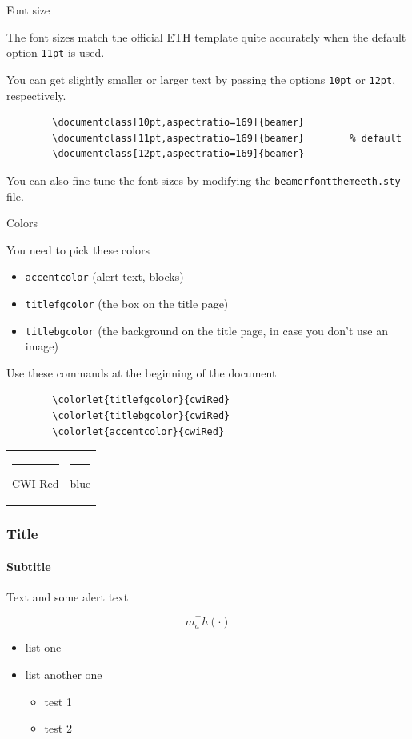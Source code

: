 \documentclass[12pt,aspectratio=169]{beamer}
\begin{document}
\begin{frame}[fragile]{Font size}

	The font sizes match the official ETH template quite accurately when the default option \verb+11pt+ is used.
	
	\bigskip
	
	You can get slightly smaller or larger text by passing the options \verb+10pt+ or \verb+12pt+, respectively.
	\begin{verbatim}
		\documentclass[10pt,aspectratio=169]{beamer}
		\documentclass[11pt,aspectratio=169]{beamer}		% default
		\documentclass[12pt,aspectratio=169]{beamer}
	\end{verbatim}	
	
	\bigskip
	You can also fine-tune the font sizes by modifying the \verb+beamerfontthemeeth.sty+ file.

\end{frame}

\begin{frame}[fragile]{Colors}

	You need to pick these colors
	\begin{itemize}
		\item \texttt{accentcolor} (alert text, blocks)
		\item \texttt{titlefgcolor} (the box on the title page)
		\item \texttt{titlebgcolor} (the background on the title page, in case you don't use an image)
	\end{itemize}
	Use these commands at the beginning of the document
	\begin{verbatim}
		\colorlet{titlefgcolor}{cwiRed}
		\colorlet{titlebgcolor}{cwiRed}
		\colorlet{accentcolor}{cwiRed}
	\end{verbatim}

	\medskip

	\begin{tabular}{ll}
	\textcolor{cwiRed}{\rule{4mm}{3mm}} CWI Red &
	\textcolor{blue}{\rule{4mm}{3mm}} blue
	\end{tabular}
	
\end{frame}

\begin{frame}

	\frametitle{Title}
	\framesubtitle{Subtitle}
	
	Text and some \alert{alert text}
	
	\[
	m_a^\top h(\cdot)
	\]
	
	
	\begin{itemize}
	\item list one
	\item list another one
		\begin{itemize}
		\item test 1
		\item test 2
		\end{itemize}
	\end{itemize}

\end{frame}
\end{document}
